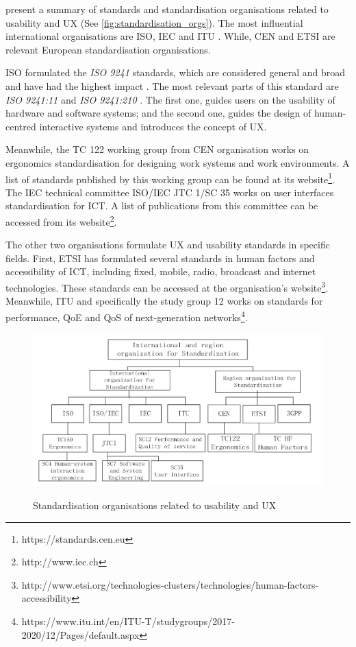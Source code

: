 \textcite{Ran2015} present a summary of standards and standardisation organisations related to usability and \ac{UX} (See \autoref{fig:standardisation_orgs}). The most influential international organisations are \ac{ISO}, \ac{IEC} and \ac{ITU} \autocite{Ran2015}. While, \ac{CEN} and  \ac{ETSI} are relevant European standardisation organisations.

\ac{ISO} formulated the \textit{ISO 9241} standards, which are considered general and broad and have had the highest impact \autocite{Ran2015}. The most relevant parts of this standard are \textit{ISO 9241:11} \autocite{iso9241:11} and \textit{ISO 9241:210} \autocite{iso9241:210}. The first one, guides users on the usability of hardware and software systems; and the second one, guides the design of human-centred interactive systems and introduces the concept of \ac{UX}.

Meanwhile, the TC 122 working group from \ac{CEN} organisation works on ergonomics standardisation for designing work systems and work environments. A list of standards published by this working group can be found at its website\footnote{https://standards.cen.eu}. The \ac{IEC} technical committee ISO/IEC JTC 1/SC 35 works on user interfaces standardisation for \ac{ICT}. A list of publications from this committee can be accessed from its website\footnote{http://www.iec.ch}.

The other two organisations formulate \ac{UX} and usability standards in specific fields. First, \ac{ETSI} has formulated several standards in human factors and accessibility of \ac{ICT}, including fixed, mobile, radio, broadcast and internet technologies. These standards can be accessed at the organisation's website\footnote{http://www.etsi.org/technologies-clusters/technologies/human-factors-accessibility}. Meanwhile, \ac{ITU} and specifically the study group 12 works on standards for performance, \ac{QoE} and \ac{QoS} of next-generation networks\footnote{https://www.itu.int/en/ITU-T/studygroups/2017-2020/12/Pages/default.aspx}.

\begin{figure}[htb]
\myfloatalign
{\includegraphics[width=\linewidth]{gfx/standard/standardisation_orgs}} \quad
\caption[Standardisation organisations related to usability and \ac{UX}]{Standardisation organisations related to usability and \ac{UX} \autocite{Ran2015}}\label{fig:standardisation_orgs}
\end{figure}

